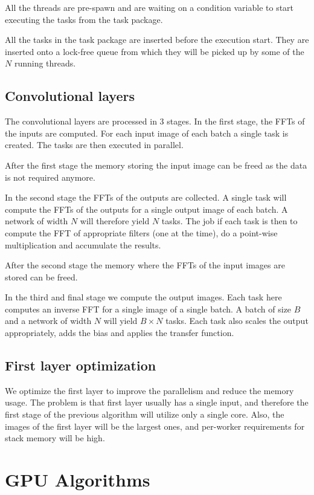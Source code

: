 \documentclass[conference]{IEEEtran}
\begin{document}
All the threads are pre-spawn and are waiting on a condition variable
to start executing the tasks from the task package.

All the tasks in the task package are inserted before the execution
start.  They are inserted onto a lock-free queue from which they will
be picked up by some of the $N$ running threads.

\subsection{Convolutional layers}

The convolutional layers are processed in 3 stages.  In the first
stage, the FFTs of the inputs are computed.  For each input image of
each batch a single task is created.  The tasks are then executed in
parallel.

After the first stage the memory storing the input image can be freed
as the data is not required anymore.

In the second stage the FFTs of the outputs are collected.  A single
task will compute the FFTs of the outputs for a single output image of
each batch.  A network of width $N$ will therefore yield $N$ tasks.
The job if each task is then to compute the FFT of appropriate filters
(one at the time), do a point-wise multiplication and accumulate the
results.

After the second stage the memory where the FFTs of the input images
are stored can be freed.

In the third and final stage we compute the output images.  Each task
here computes an inverse FFT for a single image of a single batch.  A
batch of size $B$ and a network of width $N$ will yield $B \times N$
tasks.  Each task also scales the output appropriately, adds the bias
and applies the transfer function.

\subsection{First layer optimization}

We optimize the first layer to improve the parallelism and reduce the
memory usage.  The problem is that first layer usually has a single
input, and therefore the first stage of the previous algorithm will
utilize only a single core.  Also, the images of the first layer will
be the largest ones, and per-worker requirements for stack memory will
be high.

\section{GPU Algorithms}
\end{document}
